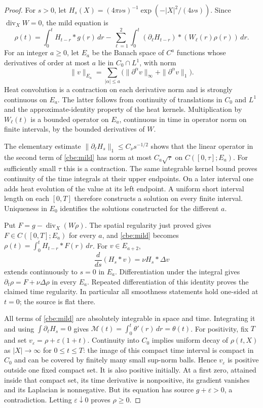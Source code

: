 \begin{proof}
For $s>0$, let
$H_s(X)=(4\pi\nu s)^{-1}\exp(-|X|^2/(4\nu s))$.
Since $\operatorname{div}_XW=0$, the mild equation is
\begin{equation}\label{cbe:mild}
 \rho(t)=\int_0^t H_{t-r}*g(r)\,dr
 -\sum_{\ell=1}^2\int_0^t
       (\partial_\ell H_{t-r})*(W_\ell(r)\rho(r))\,dr.
\end{equation}
For an integer $a\ge0$, let $E_a$ be the Banach space of $C^a$
functions whose derivatives of order at most $a$ lie in $C_0\cap L^1$,
with norm
\[
 \|v\|_{E_a}=\sum_{|\alpha|\le a}
       \bigl(\|\partial^\alpha v\|_\infty
                    +\|\partial^\alpha v\|_1\bigr).
\]
Heat convolution is a contraction on each derivative norm and is
strongly continuous on $E_a$.  The latter follows from continuity
of translations in $C_0$ and $L^1$ and the approximate-identity
property of the heat kernels.  Multiplication by $W_\ell(t)$ is a
bounded operator on $E_a$, continuous in time in operator norm on
finite intervals, by the bounded derivatives of $W$.

The elementary estimate
$\|\partial_\ell H_s\|_1\le C_\nu s^{-1/2}$ shows that the linear
operator in the second term of \eqref{cbe:mild} has norm at most
$C_a\sqrt{\tau}$ on $C([0,\tau];E_a)$.  For sufficiently small
$\tau$ this is a contraction.  The same integrable kernel bound
proves continuity of the time integrals at their upper endpoints.
On a later interval one adds heat evolution of the value at its
left endpoint.  A uniform short interval length on each $[0,T]$
therefore constructs a solution on every finite interval.  Uniqueness
in $E_0$ identifies the solutions constructed for the different $a$.

Put $F=g-\operatorname{div}_X(W\rho)$.  The spatial regularity just
proved gives $F\in C([0,T];E_a)$ for every $a$, and
\eqref{cbe:mild} becomes
$\rho(t)=\int_0^tH_{t-r}*F(r)\,dr$.
For $v\in E_{a+2}$,
\[
 \frac{d}{ds}(H_s*v)=\nu H_s*\Delta v
\]
extends continuously to $s=0$ in $E_a$.  Differentiation under the
integral gives $\partial_t\rho=F+\nu\Delta\rho$ in every $E_a$.
Repeated differentiation of this identity proves the claimed time
regularity.  In particular all smoothness statements hold one-sided
at $t=0$; the source is flat there.

All terms of \eqref{cbe:mild} are absolutely integrable in space and
time.  Integrating it and using
$\int\partial_\ell H_s=0$ gives
$\mathcal M(t)=\int_0^t\theta'(r)\,dr=\theta(t)$.
For positivity, fix $T$ and set
$v_\varepsilon=\rho+\varepsilon(1+t)$.
Continuity into $C_0$ implies uniform decay of $\rho(t,X)$ as
$|X|\to\infty$ for $0\le t\le T$: the image of this compact time
interval is compact in $C_0$ and can be covered by finitely many
small sup-norm balls.  Hence $v_\varepsilon$ is positive outside
one fixed compact set.  It is also positive initially.  At a first
zero, attained inside that compact set, its time derivative is
nonpositive, its gradient vanishes and its Laplacian is nonnegative.
But its equation has source $g+\varepsilon>0$, a contradiction.
Letting $\varepsilon\downarrow0$ proves $\rho\ge0$.
\end{proof}

